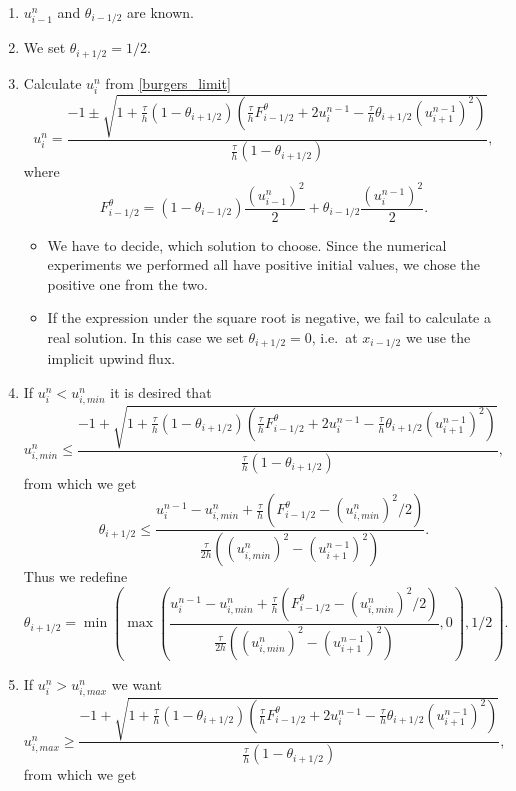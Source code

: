 \documentclass[../include.tex]{subfiles}
\begin{document}
\begin{enumerate}
	\item $ u_{i-1}^n $ and $ \theta_{i-1/2} $ are known.
	\item We set $ \theta_{i+1/2} = 1/2 $.
	\item Calculate $ u_i^n $ from \eqref{burgers_limit}
	\begin{equation}
		\label{u_i^n_burgers}
		u_i^n = \frac{-1 \pm \sqrt{1+\frac{\tau}{h}(1-\theta_{i+1/2})(\frac{\tau}{h}F^{\theta}_{i-1/2} +2 u_i^{n-1}-\frac{\tau}{h}\theta_{i+1/2} (u_{i+1}^{n-1})^2)}}{\frac{\tau}{h}(1-\theta_{i+1/2})},
	\end{equation}
	where 
	 \[F^{\theta}_{i-1/2} = (1 - \theta_{i-1/2})\frac{(u^n_{i-1})^2}{2} + \theta_{i-1/2}\frac{(u^{n-1}_{i})^2}{2}.\]
	\begin{itemize}
		\item We have to decide, which solution to choose. Since the numerical experiments we performed all have positive initial values, we chose the positive one from the two.
		\item If the expression under the square root is negative, we fail to calculate a real solution. In this case we set $ \theta_{i+1/2} = 0 $, i.e.\ at $ x_{i-1/2} $ we use the implicit upwind flux.
	\end{itemize}
	\item If $ u_i^n < u_{i,min}^n $ it is desired that
	\[
	u_{i,min}^n \leq \frac{-1 + \sqrt{1+\frac{\tau}{h}(1-\theta_{i+1/2})(\frac{\tau}{h}F^{\theta}_{i-1/2} +2 u_i^{n-1}-\frac{\tau}{h}\theta_{i+1/2} (u_{i+1}^{n-1})^2)}}{\frac{\tau}{h}(1-\theta_{i+1/2})},
	\]
	from which we get
	\begin{equation}
			\theta_{i+1/2} \leq \frac{u_i^{n-1} - u_{i,min}^n + \frac{\tau}{h}(F^{\theta}_{i-1/2} - (u_{i,min}^n)^2/2)}{\frac{\tau}{2h}((u_{i,min}^n)^2 - (u_{i+1}^{n-1})^2)}.
	\end{equation}
	Thus we redefine
	\begin{equation}
		\theta_{i+1/2} = \min \left(\max\left(\frac{u_i^{n-1} - u_{i,min}^n + \frac{\tau}{h}(F^{\theta}_{i-1/2} - (u_{i,min}^n)^2/2)}{\frac{\tau}{2h}((u_{i,min}^n)^2 - (u_{i+1}^{n-1})^2)},0\right),1/2\right).
	\end{equation}
	\item If $ u_i^n > u_{i,max}^n $ we want
	\[
	u_{i,max}^n \geq \frac{-1 + \sqrt{1+\frac{\tau}{h}(1-\theta_{i+1/2})(\frac{\tau}{h}F^{\theta}_{i-1/2} +2 u_i^{n-1}-\frac{\tau}{h}\theta_{i+1/2} (u_{i+1}^{n-1})^2)}}{\frac{\tau}{h}(1-\theta_{i+1/2})},
	\]
	from which we get
	\begin{equation}

\end{equation}
\end{enumerate}
\end{document}
